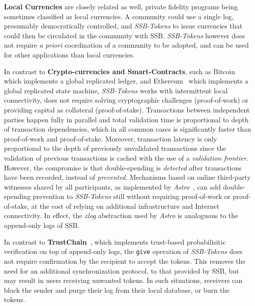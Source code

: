 \documentclass[sigplan,screen,10pt]{acmart}
\newcommand\ssbtokens[0]{\textit{SSB-Tokens} }
\begin{document}
\textbf{Local Currencies} are closely related as well, private fidelity programs being sometimes classified as local currencies. A community could use a single log, presumably democratically controlled, and \ssbtokens to issue currencies that could then be circulated in the community with SSB. \ssbtokens however does not require \textit{a priori} coordination of a community to be adopted, and can be used for other applications than local currencies.

In contrast to \textbf{Crypto-currencies and Smart-Contracts}, such as Bitcoin~\cite{nakamoto2008bitcoin} which implements a global replicated ledger, and Ethereum~\cite{buterin2014next} which implements a global replicated state machine, \ssbtokens works with intermittent local connectivity, does not require solving cryptographic challenges (proof-of-work) or providing capital as collateral (proof-of-stake). Transactions between independent parties happen fully in parallel and total validation time is proportional to depth of transaction dependencies, which in all common cases is significantly faster than proof-of-work and proof-of-stake. Moreover, transaction latency is only proportional to the depth of previously unvalidated transactions since the validation of previous transactions is cached with the use of a \textit{validation frontier}. However, the compromise is that double-spending is \textit{detected} after transactions have been recorded, instead of \textit{prevented}. Mechanisms based on online third-party witnesses shared by all participants, as implemented by \textit{Astro}~\cite{collins2020online}, can add double-spending prevention to \ssbtokens still without requiring proof-of-work or proof-of-stake, at the cost of relying on additional infrastructure and Internet connectivity. In effect, the \textit{xlog} abstraction used by \textit{Astro} is analoguous to the append-only logs of SSB.

In contrast to \textbf{TrustChain}~\cite{otte2020trustchain}, which implements trust-based probabilisitic verification on top of append-only logs, the \texttt{give} operation of \ssbtokens  does not require confirmation by the recipient to accept the tokens. This removes the need for an additional synchronization protocol, to that provided by SSB, but may result in users receiving unwanted tokens. In such situations, receivers can block the sender and purge their log from their local database, or burn the tokens.
\end{document}
